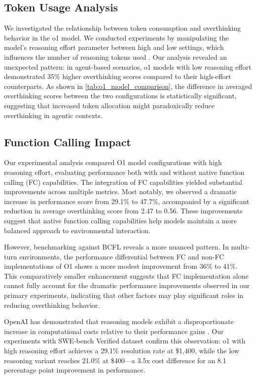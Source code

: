 \subsection{Token Usage Analysis}
We investigated the relationship between token consumption and overthinking behavior in the o1 model. We conducted experiments by manipulating the model's reasoning effort parameter between high and low settings, which influences the number of reasoning tokens used \cite{openai_chat_api}. Our analysis revealed an unexpected pattern: in agent-based scenarios, o1 models with low reasoning effort demonstrated 35\% higher overthinking scores compared to their high-effort counterparts. As shown in \cref{tab:o1_model_comparison}, the difference in averaged overthinking scores between the two configurations is statistically significant, suggesting that increased token allocation might paradoxically reduce overthinking in agentic contexts.

\subsection{Function Calling Impact}
Our experimental analysis compared O1 model configurations with high reasoning effort, evaluating performance both with and without native function calling (FC) capabilities. The integration of FC capabilities yielded substantial improvements across multiple metrics. Most notably, we observed a dramatic increase in performance score from 29.1\% to 47.7\%, accompanied by a significant reduction in average overthinking score from 2.47 to 0.56. These improvements suggest that native function calling capabilities help models maintain a more balanced approach to environmental interaction.

However, benchmarking against BCFL \cite{berkeley-function-calling-leaderboard} reveals a more nuanced pattern. In multi-turn environments, the performance differential between FC and non-FC implementations of O1 shows a more modest improvement from 36\% to 41\%. This comparatively smaller enhancement suggests that FC implementation alone cannot fully account for the dramatic performance improvements observed in our primary experiments, indicating that other factors may play significant roles in reducing overthinking behavior.

OpenAI has demonstrated that reasoning models exhibit a disproportionate increase in computational costs relative to their performance gains \cite{arcprize2024oai}. Our experiments with SWE-bench Verified dataset confirm this observation: o1 with high reasoning effort achieves a 29.1\% resolution rate at \$1,400, while the low reasoning variant reaches 21.0\% at \$400—a 3.5x cost difference for an 8.1 percentage point improvement in performance.

